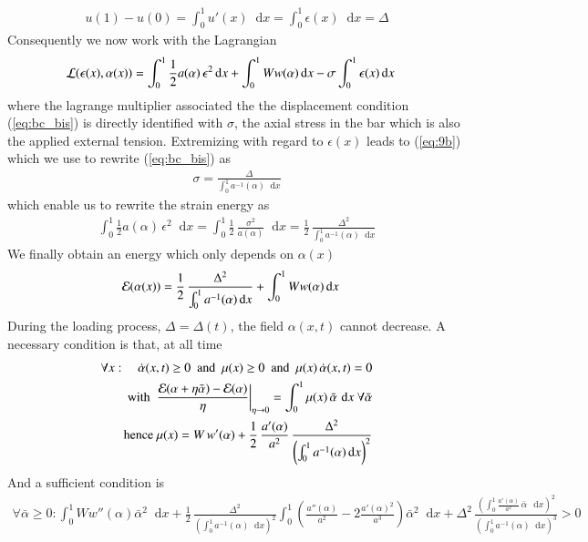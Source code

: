\documentclass[final,3p,times,authoryear]{elsarticle}
\renewcommand*\d{\mathop{}\!\mathrm{d}} %
\begin{document}
\begin{align}
\label{eq:bc_bis}
u(1)-u(0) = \int_0^1 u'(x) \d x = \int_0^1 \epsilon(x) \d x =  \Delta
\end{align}
Consequently we now work with the Lagrangian
\begin{align}
{\cal L}(\epsilon(x),\alpha(x)) & = \int_0^1 \frac12 a(\alpha) \, \epsilon^2 \d x+ \int_0^1 W  w(\alpha) \d x - \sigma \int_0^1 \epsilon(x) \d x
\end{align}
where the lagrange multiplier associated the the displacement condition (\ref{eq:bc_bis}) is directly identified with $\sigma$, the axial stress in the bar which is also the applied external tension.
Extremizing with regard to $\epsilon(x)$ leads to (\ref{eq:9b}) which we use to rewrite (\ref{eq:bc_bis}) as
\begin{align}
\sigma = \frac{\Delta}{ \int_0^1 a^{-1}(\alpha)  \d x}
\end{align}
which enable us to rewrite the strain energy as
\begin{align}
 \int_0^1 \frac12 a(\alpha) \, \epsilon^2 \d x =  \int_0^1 \frac12 \, \frac{\sigma^2}{a(\alpha)}  \d x
 = \frac12 \, \frac{\Delta^2}{\int_0^1 a^{-1}(\alpha) \d x}
\end{align}
We finally obtain an energy which only depends on $\alpha(x)$
\begin{align}
{\cal E}(\alpha(x)) & = \frac12 \, \frac{\Delta^2}{\int_0^1 a^{-1}(\alpha) \d x}  +
 \int_0^1 W  w(\alpha) \d x
\end{align}
During the loading process, $\Delta = \Delta(t)$, the field $\alpha(x,t)$ cannot decrease.
A necessary condition is that, at all time
\begin{subequations}
\begin{align}
\forall x: \quad \dot{\alpha}(x,t) \ge 0 \text{~ and ~}
\mu(x) \ge 0 \text{~ and ~}
\mu(x) \, \dot{\alpha}(x,t) = 0 \\
\text{ with } \left. \frac{{\cal E}(\alpha+\eta \bar{\alpha})-{\cal E}(\alpha)}{\eta} \right|_{\eta \to 0}
=
\int_0^1 \mu(x) \, \bar{\alpha} \, \d x \text{ } \forall \bar{\alpha}
\\
\text{ hence } \mu(x)=
W \, w'(\alpha) + \frac12 \, \frac{a'(\alpha)}{a^2 } \, \frac{\Delta^2}{\left( \int_0^1 a^{-1}(\alpha) \d x \right)^2} \label{eq:mu_critere}
\end{align}
\end{subequations}
And a sufficient condition is
\begin{align}
\forall \bar{\alpha} \ge0: \int_0^1 W w''(\alpha) \bar{\alpha}^2 \d x +
 \frac12  \, \frac{\Delta^2}{\left( \int_0^1 a^{-1}(\alpha) \d x \right)^2}
\int_0^1
\left(
\frac{a''(\alpha)}{a^2 } -2\frac{a'(\alpha)^2}{a^3 }
\right)
\bar{\alpha}^2 \d x
+
\Delta^2 \, \frac{\left( \int_0^1 \frac{a'(\alpha)}{a^2} \, \bar{\alpha} \, \d x \right)^2 }{\left( \int_0^1 a^{-1}(\alpha) \d x \right)^3}
>0
\end{align}
\end{document}
